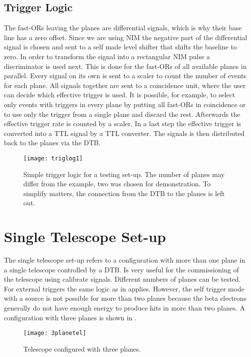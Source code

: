 \subsection{Trigger Logic}\label{striglog1}
The fast-ORs leaving the planes are differential signals, which is why their base line has a zero offset. Since we are using NIM the negative part of the differential signal is chosen and sent to a self made level shifter that shifts the baseline to zero. In order to transform the signal into a rectangular NIM pulse a discriminator is used next. This is done for the fast-ORs of all available planes in parallel. Every signal on its own is sent to a scaler to count the number of events for each plane. All signals together are sent to a coincidence unit, where the user can decide which effective trigger is used. It is possible, for example, to select only events with triggers in every plane by putting all fast-ORs in coincidence or to use only the trigger from a single plane and discard the rest. Afterwards the effective trigger rate is counted by a scaler. In a last step the effective trigger is converted into a \ac{TTL} signal by a \ac{TTL} converter. The signals is then distributed back to the planes via the \ac{DTB}.
\begin{figure}[ht]
	\centering
	\texttt{[image: triglog1]}
	\caption{Simple trigger logic for a testing set-up. The number of planes may differ from the example, two was chosen for demonstration. To simplify matters, the connection from the \ac{DTB} to the planes is left out.}
	\label{plogic1}
\end{figure}\no
\section{Single Telescope Set-up}
The single telescope set-up refers to a configuration with more than one plane in a single telescope controlled by a \ac{DTB}. Is very useful for the commissioning of the telescope using calibrate signals. Different numbers of planes can be tested. For external triggers the same logic as in  applies. However, the self trigger mode with a source is not possible for more than two planes because the beta electrons generally do not have enough energy to produce hits in more than two planes. A configuration with three planes is shown in .
\begin{figure}[ht]
	\centering
	\texttt{[image: 3planetel]}
	\caption{Telescope configured with three planes.}
	\label{p3plane}
\end{figure}\no

